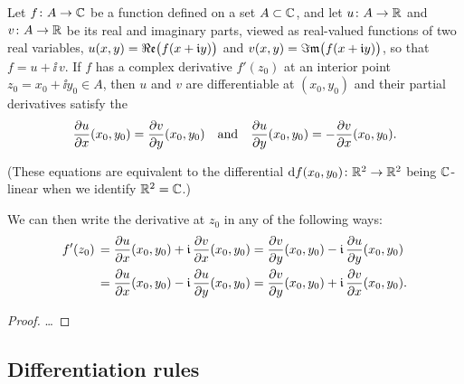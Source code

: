 \begin{lemma}
  \label{lem:complex_derivative_implies_differentiable}
  Let $f \colon A \to \mathbb{C}$ be a function defined on a set $A \subset \mathbb{C}$,
  and let $u \colon A \to \mathbb{R}$ and $v \colon A \to \mathbb{R}$ be its
  real and imaginary parts, viewed as real-valued functions of two real variables,
  $u(x,y) = \Re\mathfrak{e} \big( f (x + \mathfrak{i} y) \big)$ and
  $v(x,y) = \Im\mathfrak{m} \big( f (x + \mathfrak{i} y) \big)$,
  so that $f = u + \ii \, v$.
  If $f$ has a complex derivative $f'(z_0)$ at an interior
  point $z_0 = x_0 + \ii y_0 \in A$, then $u$ and $v$ are differentiable
  at $(x_0,y_0)$ and their partial derivatives satisfy the
  \begin{align*}
    \frac{\partial {u}}{\partial {x}}(x_0,y_0) = \frac{\partial {v}}{\partial {y}}(x_0,y_0)
    \quad \text{and} \quad
    \frac{\partial {u}}{\partial {y}}(x_0,y_0) = - \frac{\partial {v}}{\partial {x}}(x_0,y_0).
  \end{align*}

  (These equations are equivalent to the differential
  $\mathrm{d} f (x_0, y_0) \colon \mathbb{R}^2 \to \mathbb{R}^2$
  being $\mathbb{C}$-linear when we identify $\mathbb{R}^2 = \mathbb{C}$.)

  We can then write the derivative at $z_0$ in any of the following ways:
  \begin{align*}
    f'(z_0) \, = \; & \frac{\partial {u}}{\partial {x}}(x_0,y_0) + \mathfrak{i} \, \frac{\partial {v}}{\partial {x}}(x_0,y_0)
    = \frac{\partial {v}}{\partial {y}}(x_0,y_0) - \mathfrak{i} \, \frac{\partial {u}}{\partial {y}}(x_0,y_0) \\
    = \; & \frac{\partial {u}}{\partial {x}}(x_0,y_0) - \mathfrak{i} \, \frac{\partial {u}}{\partial {y}}(x_0,y_0)
    = \frac{\partial {v}}{\partial {y}}(x_0,y_0) + \mathfrak{i} \, \frac{\partial {v}}{\partial {x}}(x_0,y_0) .
  \end{align*}

\end{lemma}
\begin{proof}
  \ldots
\end{proof}



\subsection{Differentiation rules}

